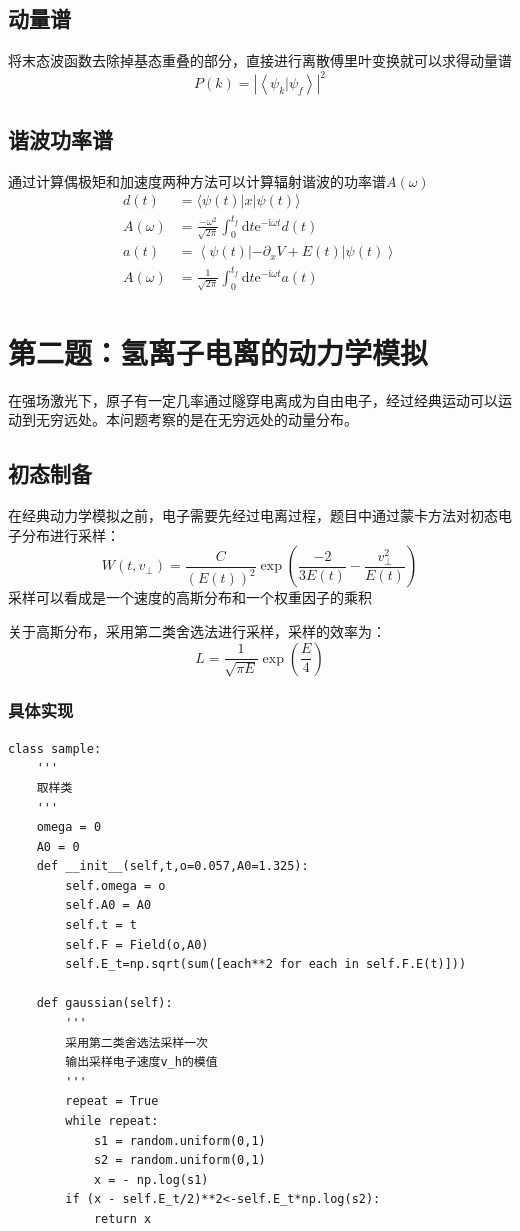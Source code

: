 \documentclass[a4paper]{ctexart}
\begin{document}
\subsection{动量谱}
将末态波函数去除掉基态重叠的部分，直接进行离散傅里叶变换就可以求得动量谱
\begin{equation}
P(k)=\left|\left\langle\psi_{k} | \psi_{f}\right\rangle\right|^{2}
\end{equation}
\subsection{谐波功率谱}
通过计算偶极矩和加速度两种方法可以计算辐射谐波的功率谱$A(\omega)$
\begin{equation}
\begin{aligned} d(t) &=\langle\psi(t)|x| \psi(t)\rangle \\ A(\omega) &=\frac{-\omega^{2}}{\sqrt{2 \pi}} \int_{0}^{t_{f}} \mathrm{d} t \mathrm{e}^{-\mathrm{i} \omega t} d(t) \\ a(t) &=\left\langle\psi(t)\left|-\partial_{x} V+E(t)\right| \psi(t)\right\rangle \\ A(\omega) &=\frac{1}{\sqrt{2 \pi}} \int_{0}^{t_{f}} \mathrm{d} t \mathrm{e}^{-\mathrm{i} \omega t} a(t) \end{aligned}
\end{equation}

\section{第二题：氢离子电离的动力学模拟}
在强场激光下，原子有一定几率通过隧穿电离成为自由电子，经过经典运动可以运动到无穷远处。本问题考察的是在无穷远处的动量分布。
\subsection{初态制备}
在经典动力学模拟之前，电子需要先经过电离过程，题目中通过蒙卡方法对初态电子分布进行采样：
\begin{equation}
W\left(t, v_{\perp}\right)=\frac{C}{(E(t))^{2}} \exp \left(\frac{-2}{3 E(t)}-\frac{v_{\perp}^{2}}{E(t)}\right)
\end{equation}
采样可以看成是一个速度的高斯分布和一个权重因子的乘积

关于高斯分布，采用第二类舍选法进行采样，采样的效率为：
\begin{equation}
L=\frac{1}{\sqrt{\pi E}} \exp \left(\frac{E}{4}\right)
\end{equation}
\subsubsection{具体实现}
\begin{lstlisting}
class sample:
	'''
	取样类
	'''
	omega = 0
	A0 = 0
	def __init__(self,t,o=0.057,A0=1.325):
		self.omega = o
		self.A0 = A0
		self.t = t
		self.F = Field(o,A0)
		self.E_t=np.sqrt(sum([each**2 for each in self.F.E(t)]))
	
	def gaussian(self):
		'''
		采用第二类舍选法采样一次
		输出采样电子速度v_h的模值
		'''
		repeat = True
		while repeat:
			s1 = random.uniform(0,1)
			s2 = random.uniform(0,1)
			x = - np.log(s1)
		if (x - self.E_t/2)**2<-self.E_t*np.log(s2):
			return x
\end{lstlisting}
\end{document}
